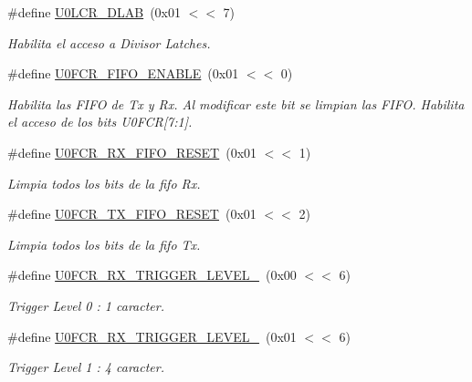 \begin{DoxyCompactItemize}
\#define \hyperlink{group___l_c_r_b_i_t_s_ga7b13c20c8707623317b4b8d452291193}{U0\+L\+C\+R\+\_\+\+D\+L\+AB}~(0x01 $<$$<$ 7)
\begin{DoxyCompactList}\small\item\em Habilita el acceso a Divisor Latches. \end{DoxyCompactList}\item 
\#define \hyperlink{group___l_c_r_b_i_t_s_ga63421105f318c07c617f31b8690d235d}{U0\+F\+C\+R\+\_\+\+F\+I\+F\+O\+\_\+\+E\+N\+A\+B\+LE}~(0x01 $<$$<$ 0)
\begin{DoxyCompactList}\small\item\em Habilita las F\+I\+FO de Tx y Rx. Al modificar este bit se limpian las F\+I\+FO. Habilita el acceso de los bits U0\+F\+CR\mbox{[}7\+:1\mbox{]}. \end{DoxyCompactList}\item 
\#define \hyperlink{group___l_c_r_b_i_t_s_ga240a3e574e516161ecce09cfdf83c5c8}{U0\+F\+C\+R\+\_\+\+R\+X\+\_\+\+F\+I\+F\+O\+\_\+\+R\+E\+S\+ET}~(0x01 $<$$<$ 1)
\begin{DoxyCompactList}\small\item\em Limpia todos los bits de la fifo Rx. \end{DoxyCompactList}\item 
\#define \hyperlink{group___l_c_r_b_i_t_s_ga6d547993f119687d90a053c8266b4e93}{U0\+F\+C\+R\+\_\+\+T\+X\+\_\+\+F\+I\+F\+O\+\_\+\+R\+E\+S\+ET}~(0x01 $<$$<$ 2)
\begin{DoxyCompactList}\small\item\em Limpia todos los bits de la fifo Tx. \end{DoxyCompactList}\item 
\#define \hyperlink{group___l_c_r_b_i_t_s_ga464b2e23a47585bf3710a5d71cf03e39}{U0\+F\+C\+R\+\_\+\+R\+X\+\_\+\+T\+R\+I\+G\+G\+E\+R\+\_\+\+L\+E\+V\+E\+L\+\_}~(0x00 $<$$<$ 6)
\begin{DoxyCompactList}\small\item\em Trigger Level 0 \+: 1 caracter. \end{DoxyCompactList}\item 
\#define \hyperlink{group___l_c_r_b_i_t_s_ga3678812db1dc70d302edaa1ed75fc6de}{U0\+F\+C\+R\+\_\+\+R\+X\+\_\+\+T\+R\+I\+G\+G\+E\+R\+\_\+\+L\+E\+V\+E\+L\+\_}~(0x01 $<$$<$ 6)
\begin{DoxyCompactList}\small\item\em Trigger Level 1 \+: 4 caracter. \end{DoxyCompactList}\item 

\end{DoxyCompactItemize}
